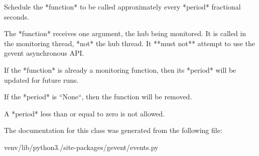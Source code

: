 \begin{DoxyVerb}Schedule the *function* to be called approximately every *period* fractional seconds.

The *function* receives one argument, the hub being monitored. It is called
in the monitoring thread, *not* the hub thread. It **must not** attempt to
use the gevent asynchronous API.

If the *function* is already a monitoring function, then its *period*
will be updated for future runs.

If the *period* is ``None``, then the function will be removed.

A *period* less than or equal to zero is not allowed.
\end{DoxyVerb}
 

The documentation for this class was generated from the following file\+:\begin{DoxyCompactItemize}
\item 
venv/lib/python3./site-\/packages/gevent/events.\+py\end{DoxyCompactItemize}
